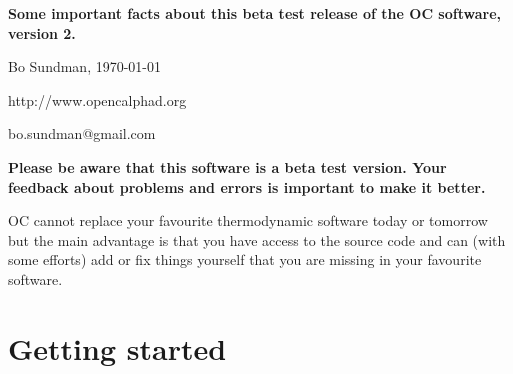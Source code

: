 \documentclass[12pt]{article}
\begin{document}
\begin{center}
{\Large \bf Some important facts about this beta test release of the
  OC software, version 2.}

Bo Sundman, \today

http://www.opencalphad.org

bo.sundman@gmail.com
\end{center}

{\large \bf Please be aware that this software is a beta test version.
Your feedback about problems and errors is important to make it
better.}

OC cannot replace your favourite thermodynamic software today or
tomorrow but the main advantage is that you have access to the source
code and can (with some efforts) add or fix things yourself that you
are missing in your favourite software.

\section{Getting started}
\end{document}
